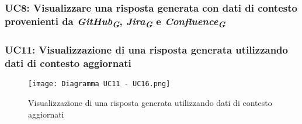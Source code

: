 \hypertarget{UC8}{}
\subsubsection{UC8: Visualizzare una risposta generata con dati di contesto provenienti da 
\emph{GitHub}\textsubscript{\textbf{\textit{G}}}, \emph{Jira}\textsubscript{\textbf{\textit{G}}} e 
\emph{Confluence}\textsubscript{\textbf{\textit{G}}}}






\hypertarget{UC11}{}
\subsubsection{UC11: Visualizzazione di una risposta generata utilizzando dati di contesto aggiornati}

\begin{figure}[h]
    \centering
    \texttt{[image: Diagramma UC11 - UC16.png]}
    \caption{Visualizzazione di una risposta generata utilizzando dati di contesto aggiornati}
\end{figure}

